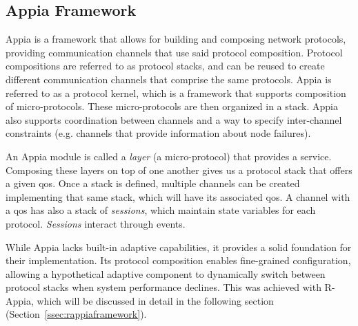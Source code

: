 \subsection{Appia Framework}
\label{ssec:appiaframework}
\par Appia \cite{Miranda2001} is a framework that allows for building and composing network protocols, providing communication channels that use said protocol composition. Protocol compositions are referred to as protocol stacks, and can be reused to create different communication channels that comprise the same protocols. Appia is referred to as a protocol kernel, which is a framework that supports composition of micro-protocols. These micro-protocols are then organized in a stack. Appia also supports coordination between channels and a way to specify inter-channel constraints (e.g. channels that provide information about node failures).%
\par An Appia module is called a \textit{layer} (a micro-protocol) that provides a service. Composing these layers on top of one another gives us a protocol stack that offers a given \gls{qos}. Once a stack is defined, multiple channels can be created implementing that same stack, which will have its associated \gls{qos}. A channel with a \gls{qos}  has also a stack of \textit{sessions}, which maintain state variables for each protocol. \textit{Sessions} interact through events.
\par While Appia lacks built-in adaptive capabilities, it provides a solid foundation for their implementation. Its protocol composition enables fine-grained configuration, allowing a hypothetical adaptive component to dynamically switch between protocol stacks when system performance declines. This was achieved with R-Appia, which will be discussed in detail in the following section (Section~\ref{ssec:rappiaframework}).
%
%
%
